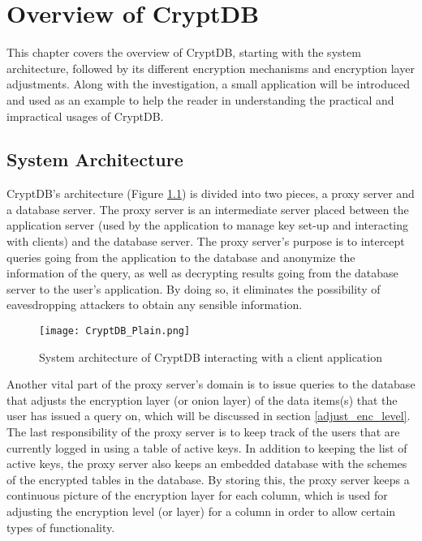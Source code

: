 \chapter{Overview of CryptDB}
\label{chp:overview_cryptDB}

This chapter covers the overview of CryptDB, starting with the system architecture, followed by its different encryption mechanisms and encryption layer adjustments. Along with the investigation, a small application will be introduced and used as an example to help the reader in understanding the practical and impractical usages of CryptDB.

\section{System Architecture}
\label{sec:sysarc}

CryptDB's architecture (Figure \ref{cryptdb_plain}) is divided into two pieces, a proxy server and a database server. The proxy server is an intermediate server placed between the application server (used by the application to manage key set-up and interacting with clients) and the database server. The proxy server's purpose is to intercept queries going from the application to the database and anonymize the information of the query, as well as decrypting results going from the database server to the user's application. By doing so, it eliminates the possibility of eavesdropping attackers to obtain any sensible information. %

\begin{figure}[H]
	\texttt{[image: CryptDB\_Plain.png]}
	\caption{System architecture of CryptDB interacting with a client application}
	\label{cryptdb_plain}
\end{figure}

Another vital part of the proxy server's domain is to issue queries to the database that adjusts the encryption layer (or onion layer) of the data items(s) that the user has issued a query on, which will be discussed in section \ref{adjust_enc_level}. The last responsibility of the proxy server is to keep track of the users that are currently logged in using a table of active keys. In addition to keeping the list of active keys, the proxy server also keeps an embedded database with the schemes of the encrypted tables in the database. By storing this, the proxy server keeps a continuous picture of the encryption layer for each column, which is used for adjusting the encryption level (or layer) for a column in order to allow certain types of functionality.

